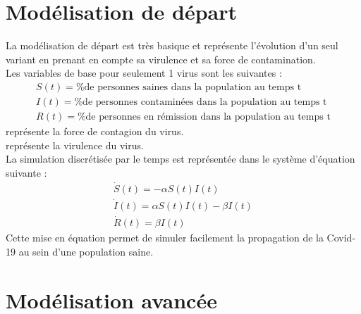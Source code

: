 \documentclass{article}
\begin{document}
\section{Modélisation de départ}

La modélisation de départ est très basique et représente l'évolution d'un seul variant en prenant en compte sa virulence et sa force de contamination.\\
\noindent
Les variables de base pour seulement 1 virus sont les suivantes :
\begin{align}
    S(t)= \text{\% de personnes saines dans la population au temps t} \\
    I(t)= \text{\% de personnes contaminées dans la population au temps t} \\
    R(t)= \text{\% de personnes en rémission dans la population au temps t}
\end{align}
\noindent
\textalpha \space représente la force de contagion du virus. \\
\textbeta \space représente la virulence du virus. \\
\noindent
La simulation discrétisée par le temps est représentée dans le système d'équation suivante :
\begin{align}
    \dot{S}(t)= -\alpha S(t)I(t) \\
    \dot{I}(t)= \alpha S(t)I(t)-\beta I(t) \\
    \dot{R}(t)= \beta I(t)
\end{align}
\noindent
Cette mise en équation permet de simuler facilement la propagation de la Covid-19 au sein d'une population saine.\\

\section{Modélisation avancée}
\end{document}
